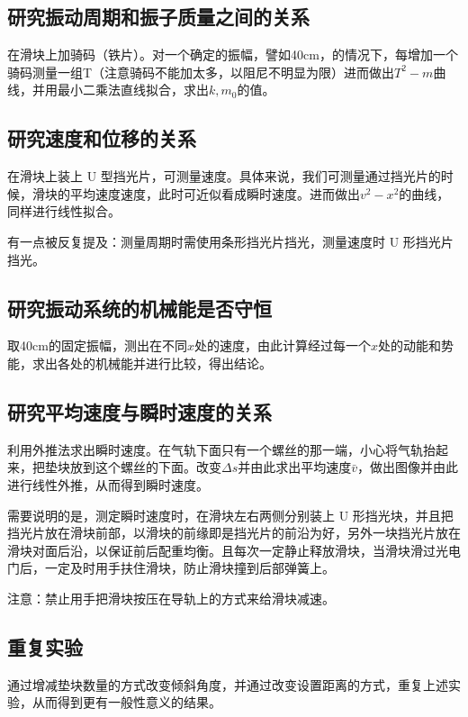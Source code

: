 \documentclass[11pt]{article}
\begin{document}
\subsection{研究振动周期和振子质量之间的关系}

在滑块上加骑码（铁片）。对一个确定的振幅，譬如40cm，的情况下，每增加一个骑码测量一组T（注意骑码不能加太多，以阻尼不明显为限）进而做出$T^2-m$曲线，并用最小二乘法直线拟合，求出$k,m_0$的值。

\subsection{研究速度和位移的关系}

在滑块上装上 U 型挡光片，可测量速度。具体来说，我们可测量通过挡光片的时候，滑块的平均速度速度，此时可近似看成瞬时速度。进而做出$v^2-x^2$的曲线，同样进行线性拟合。

有一点被反复提及：测量周期时需使用条形挡光片挡光，测量速度时 U 形挡光片挡光。

\subsection{研究振动系统的机械能是否守恒}

取40cm的固定振幅，测出在不同$x$处的速度，由此计算经过每一个$x$处的动能和势能，求出各处的机械能并进行比较，得出结论。

\subsection{研究平均速度与瞬时速度的关系}

利用外推法求出瞬时速度。在气轨下面只有一个螺丝的那一端，小心将气轨抬起来，把垫块放到这个螺丝的下面。改变$\Delta s$并由此求出平均速度$\bar{v}$，做出图像并由此进行线性外推，从而得到瞬时速度。

需要说明的是，测定瞬时速度时，在滑块左右两侧分别装上 U 形挡光块，并且把挡光片放在滑块前部，以滑块的前缘即是挡光片的前沿为好，另外一块挡光片放在滑块对面后沿，以保证前后配重均衡。且每次一定静止释放滑块，当滑块滑过光电门后，一定及时用手扶住滑块，防止滑块撞到后部弹簧上。

注意：禁止用手把滑块按压在导轨上的方式来给滑块减速。

\subsection{重复实验}

通过增减垫块数量的方式改变倾斜角度，并通过改变设置距离的方式，重复上述实验，从而得到更有一般性意义的结果。
\end{document}
